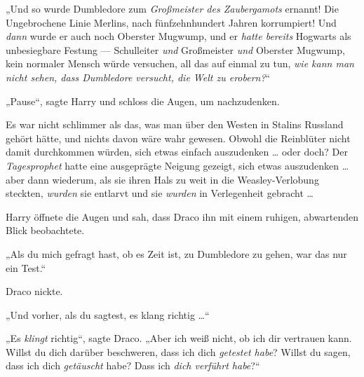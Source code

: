 „Und so wurde Dumbledore zum \emph{Großmeister des Zaubergamots} ernannt! Die Ungebrochene Linie Merlins, nach fünfzehnhundert Jahren korrumpiert! Und \emph{dann} wurde er auch noch Oberster Mugwump, und er \emph{hatte bereits} Hogwarts als unbesiegbare Festung — Schulleiter \emph{und} Großmeister \emph{und} Oberster Mugwump, kein normaler Mensch würde versuchen, all das auf einmal zu tun, \emph{wie kann man nicht sehen, dass Dumbledore versucht, die Welt zu erobern?}“

„Pause“, sagte Harry und schloss die Augen, um nachzudenken.

Es war nicht schlimmer als das, was man über den Westen in Stalins Russland gehört hätte, und nichts davon wäre wahr gewesen. Obwohl die Reinblüter nicht damit durchkommen würden, sich etwas einfach auszudenken … oder doch? Der \emph{Tagesprophet} hatte eine ausgeprägte Neigung gezeigt, sich etwas auszudenken … aber dann wiederum, als sie ihren Hals zu weit in die Weasley-Verlobung steckten, \emph{wurden} sie entlarvt und sie \emph{wurden} in Verlegenheit gebracht …

Harry öffnete die Augen und sah, dass Draco ihn mit einem ruhigen, abwartenden Blick beobachtete.

„Als du mich gefragt hast, ob es Zeit ist, zu Dumbledore zu gehen, war das nur ein Test.“

Draco nickte.

„Und vorher, als du sagtest, es klang richtig …“

„Es \emph{klingt} richtig“, sagte Draco.
„Aber ich weiß nicht, ob ich dir vertrauen kann. Willst du dich darüber beschweren, dass ich dich \emph{getestet habe}? Willst du sagen, dass ich dich \emph{getäuscht} habe? Dass ich \emph{dich verführt habe}?“

